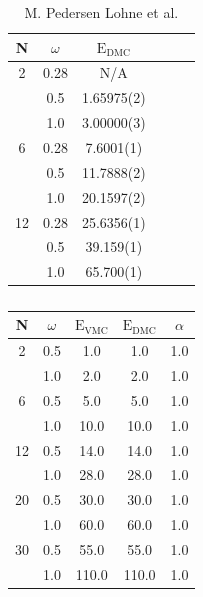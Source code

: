 \begin{table}
\begin{center}
\label{tab:LohneRes}
\begin{tabular}{cc|cccc}
    N     & $\omega$ & $\mathrm{E_{DMC}}$  \\
\hline
    2     &   0.28   &  N/A     \\
          &   0.5    & 1.65975(2)  \\
          &   1.0    &  3.00000(3) \\
    6     &   0.28   &   7.6001(1) \\
          &   0.5    &  11.7888(2) \\
          &   1.0    &  20.1597(2) \\
    12    &   0.28   &  25.6356(1) \\
          &   0.5    &  39.159(1)  \\
          &   1.0    &  65.700(1)  \\
\end{tabular}
\caption{M. Pedersen Lohne et al.}
\end{center}
\end{table}

\begin{table}
\begin{center}
\label{tab:noColValid}
\begin{tabular}{cc|ccc}
    N     & $\omega$ & $\mathrm{E_{VMC}}$ & $\mathrm{E_{DMC}}$ & $\alpha$ \\
\hline
    2     &   0.5    &   1.0    &   1.0    &   1.0    \\
          &   1.0    &   2.0    &   2.0    &   1.0    \\
    6     &   0.5    &   5.0    &   5.0    &   1.0    \\
          &   1.0    &   10.0   &   10.0   &   1.0    \\
    12    &   0.5    &   14.0   &   14.0   &   1.0    \\
          &   1.0    &   28.0   &   28.0   &   1.0    \\
    20    &   0.5    &   30.0   &   30.0   &   1.0    \\
          &   1.0    &   60.0   &   60.0   &   1.0    \\
    30    &   0.5    &   55.0   &   55.0   &   1.0    \\
          &   1.0    &  110.0   &  110.0   &   1.0    \\
\end{tabular}
\caption{}
\end{center}
\end{table}


